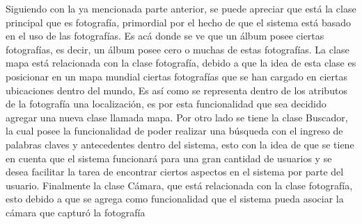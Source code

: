 \documentclass{memoria}
\begin{document}

Siguiendo con la ya mencionada parte anterior, se puede apreciar que está la clase principal que es fotografía, primordial por el hecho de que el sistema está basado en el uso de las fotografías. Es acá donde se ve que un álbum posee ciertas fotografías, es decir, un álbum posee cero o muchas de estas fotografías.
La clase mapa está relacionada con la clase fotografía, debido a que la idea de esta clase es posicionar en un mapa mundial ciertas fotografías que se han cargado en ciertas ubicaciones dentro del mundo, Es así como se representa dentro de los atributos de la fotografía una localización, es por esta funcionalidad que sea decidido agregar una nueva clase llamada mapa.
Por otro lado se tiene la clase Buscador, la cual posee la funcionalidad de poder realizar una búsqueda con el ingreso de palabras claves y antecedentes dentro del sistema, esto con la idea de que se tiene en cuenta que el sistema funcionará para una gran cantidad de usuarios y se desea facilitar la tarea de encontrar ciertos aspectos en el sistema por parte del usuario.
Finalmente la clase Cámara, que está relacionada con la clase fotografía, esto debido a que se agrega como funcionalidad que el sistema pueda asociar la cámara que capturó la fotografía 
\end{document}
